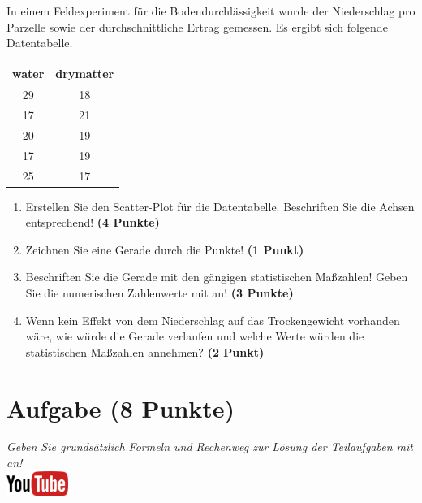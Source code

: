 \documentclass[a4paper, 9pt]{scrartcl}\usepackage[]{graphicx}\usepackage[]{xcolor}
\begin{document}
In einem Feldexperiment f{\"u}r die Bodendurchl{\"a}ssigkeit wurde der Niederschlag
pro Parzelle sowie der durchschnittliche Ertrag gemessen. Es ergibt sich
folgende Datentabelle. 

\begin{table}[!h]
\centering
\begin{tabular}{cc}
\toprule
water & drymatter\\
\midrule
29 & 18\\
17 & 21\\
20 & 19\\
17 & 19\\
25 & 17\\
\bottomrule
\end{tabular}
\end{table}



\begin{enumerate}
\item Erstellen Sie den Scatter-Plot f{\"u}r die Datentabelle. Beschriften Sie
  die Achsen entsprechend! \textbf{(4 Punkte)}
\item Zeichnen Sie eine Gerade durch die Punkte! \textbf{(1 Punkt)}
\item Beschriften Sie die Gerade mit den g{\"a}ngigen statistischen Ma{\ss}zahlen!
  Geben Sie die numerischen Zahlenwerte mit an! \textbf{(3 Punkte)}
\item Wenn kein Effekt von dem Niederschlag auf das Trockengewicht
  vorhanden w{\"a}re, wie w{\"u}rde die Gerade verlaufen und welche Werte w{\"u}rden die
  statistischen Ma{\ss}zahlen annehmen? \textbf{(2 Punkt)}
\end{enumerate} 
\clearpage

\section{Aufgabe \hfill (8 Punkte)}

\textit{Geben Sie grunds{\"a}tzlich Formeln und Rechenweg zur L{\"o}sung der
  Teilaufgaben mit an!} \\[1Ex]

\hfill\href{https://youtu.be/t_1KL77mfmg}{\includegraphics[width =
  2cm]{img/youtube}}\\[1Ex]
\end{document}
